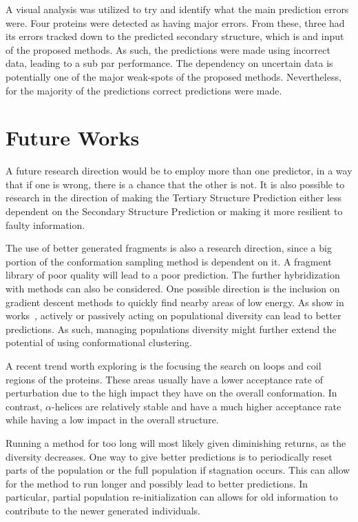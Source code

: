A visual analysis was utilized to try and identify what the main prediction
errors were. Four proteins were detected as having major errors. From these,
three had its errors tracked down to the predicted secondary structure, which is
and input of the proposed methods. As such, the predictions were made using
incorrect data, leading to a sub par performance. The dependency on
uncertain data is potentially one of the major weak-spots of the proposed methods.
Nevertheless, for the majority of the predictions correct predictions were made.

\section{Future Works}\label{sec:future_works}

A future research direction
would be to employ more than one predictor, in a way that if one is wrong,
there is a chance that the other is not. It is also possible to research in the
direction of making the Tertiary Structure Prediction either less dependent on
the Secondary Structure Prediction or making it more resilient to faulty
information.

The use of better generated fragments is also a research direction, since a big
portion of the conformation sampling method is dependent on it. A fragment
library of poor quality will lead to a poor prediction.
The further hybridization with methods can also be considered. One possible
direction is the inclusion on gradient descent methods to quickly find nearby
areas of low energy.
As show in works~,
actively or passively acting on populational diversity can lead to
better predictions. As such, managing populations diversity might further
extend the potential of using conformational clustering.

A recent trend worth exploring is the focusing the search on loops and coil
regions of the proteins. These areas usually have a lower acceptance rate of
perturbation due to the high impact they have on the overall conformation.  In
contrast, $\alpha$-helices are relatively stable and have a much higher
acceptance rate while having a low impact in the overall structure.

Running a method for too long will most likely given diminishing returns, as
the diversity decreases. One way to give better predictions is to periodically
reset parts of the population or the full population if stagnation occurs. This
can allow for the method to run longer and possibly lead to better predictions.
In particular, partial population re-initialization can allows for old information
to contribute to the newer generated individuals.

